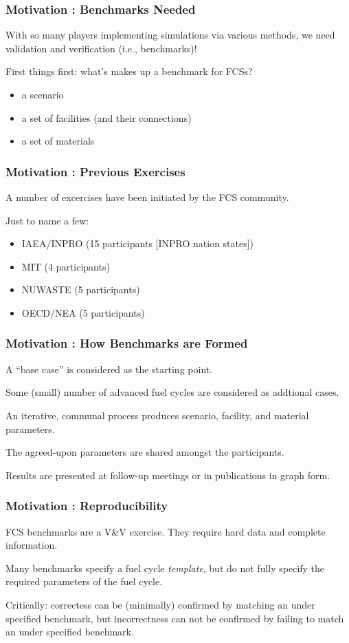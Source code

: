 
\begin{frame}[ctb!]
  \frametitle{Motivation : Benchmarks Needed} 
  With so many players implementing simulations via various methods, we need 
  validation and verification (i.e., benchmarks)!

  First things first: what's makes up a benchmark for FCSs?

  \begin{itemize}
    \item a scenario
    \item a set of facilities (and their connections)
    \item a set of materials
  \end{itemize}
\end{frame}

\begin{frame}[ctb!]
  \frametitle{Motivation : Previous Exercises}
  A number of excercises have been initiated by the FCS community.

  Just to name a few:
  \begin{itemize}
    \item IAEA/INPRO (15 participants [INPRO nation states])\cite{_international_2011}
    \item MIT (4 participants) \cite{guerin_benchmark_2009}
    \item NUWASTE (5 participants) \cite{abkowitz_workshop_2011}
    \item OECD/NEA (5 participants) \cite{boucher_benchmark_2012}
  \end{itemize}
\end{frame}

\begin{frame}[ctb!]
  \frametitle{Motivation : How Benchmarks are Formed}
  A ``base case'' is considered as the starting point.

  Some (small) number of advanced fuel cycles are considered as addtional cases.

  An iterative, communal process produces scenario, facility, and material
  parameters.

  The agreed-upon parameters are shared amongst the participants.

  Results are presented at follow-up meetings or in publications in graph form.
\end{frame}

\begin{frame}[ctb!]
  \frametitle{Motivation : Reproducibility}
  FCS benchmarks are a V\&V exercise. They require hard data and complete 
  information.

  Many benchmarks specify a fuel cycle \textit{template}, but do not fully 
  specify the required parameters of the fuel cycle.

  Critically: correctess can be (minimally) confirmed by matching an under
  specified benchmark, but incorrectness can not be confirmed by failing to
  match an under specified benchmark.
\end{frame}

